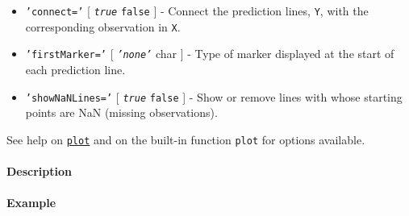  \begin{itemize}
 \item
   \texttt{'connect='} {[} \emph{\texttt{true}} \textbar{} \texttt{false}
   {]} - Connect the prediction lines, \texttt{Y}, with the corresponding
   observation in \texttt{X}.
 \item
   \texttt{'firstMarker='} {[} \emph{\texttt{'none'}} \textbar{} char {]}
   - Type of marker displayed at the start of each prediction line.
 \item
   \texttt{'showNaNLines='} {[} \emph{\texttt{true}} \textbar{}
   \texttt{false} {]} - Show or remove lines with whose starting points
   are NaN (missing observations).
 \end{itemize}
 
 See help on \href{tseries/plot}{\texttt{plot}} and on the built-in
 function \texttt{plot} for options available.
 
 \paragraph{Description}
 
 \paragraph{Example}


